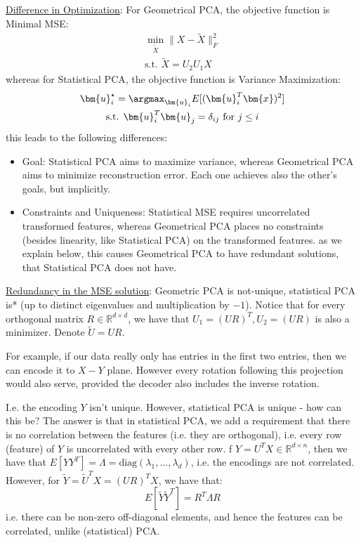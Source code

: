 \documentclass{article}
\begin{document}
\ul{Difference in Optimization}: For Geometrical PCA, the objective function is Minimal MSE:
\begin{gather*}
  \min_{\widetilde{X}} \lVert X - \widetilde{X} \rVert _F ^2 \\
  \text{s.t. } \widetilde{X} = U_{2}U_{1}X 
\end{gather*}
whereas for Statistical PCA, the objective function is Variance Maximization:
\begin{gather*}
  \bm{u}_{i} ^{\star} = \argmax_{\bm{u}_i} E[(\bm{u}_i ^{T} \bm{x})^2]   \\
  \text{s.t. } \bm{u}_i ^{T} \bm{u}_{j} = \delta_{ij} \text{ for } j \leq i
\end{gather*}
this leads to the following differences:
\begin{itemize}

  \item Goal: Statistical PCA aims to maximize variance, whereas Geometrical PCA aims to minimize reconstruction error. Each one achieves also the other's goals, but implicitly. 
  \item Constraints and Uniqueness: Statistical MSE requires uncorrelated transformed features, whereas Geometrical PCA places no constraints (besides linearity, like Statistical PCA) on the transformed features. as we explain below, this causes Geometrical PCA to have redundant solutions, that Statistical PCA does not have.
\end{itemize}

\ul{Redundancy in the MSE solution}: Geometric PCA is not-unique, statistical PCA is* (up to distinct eigenvalues and multiplication by $-1$).  Notice that for every orthogonal matrix $R \in \mathbb{R}^{d \times d}$, we have that $U_1 = (UR)^{T}, U_2 = (UR)$ is also a minimizer.  Denote $\widetilde{U}=UR$. 

For example, if our data really only has entries in the first two entries, then we can encode it to $X-Y$ plane. 
However every rotation following this projection would also serve, provided the decoder also includes the inverse rotation. 

I.e. the encoding $Y$ isn't unique.  
However, statistical PCA is unique - how can this be? 
The answer is that in statistical PCA, we add a requirement that there is no correlation between the features (i.e. they are orthogonal), i.e. every row (feature) of $Y$ is uncorrelated with every other row. 
 f $Y = U^{T} X \in \mathbb{R}^{d \times  n}$, then we have that $E[Y Y ^{T}] = \Lambda = \text{diag}(\lambda_1, \ldots, \lambda_{d})$, i.e. the encodings are not correlated. 
However, for $\widetilde{Y} = \widetilde{U}^{T} X = (UR)^{T} X$, we have that:
\[
  E[\widetilde{Y} \widetilde{Y}^{T} ] = R^{T} \Lambda R
\]
i.e. there can be non-zero off-diagonal elements, and hence the features can be  correlated, unlike (statistical) PCA. 
\end{document}
